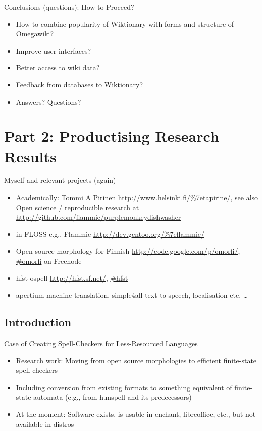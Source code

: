 \documentclass[t,12pt]{beamer}
\begin{document}
\begin{frame}{Conclusions (questions): How to Proceed?}
    \begin{itemize}
        \item How to combine popularity of Wiktionary with forms and structure
            of Omegawiki?
        \item Improve user interfaces?
        \item Better access to wiki data?
        \item Feedback from databases to Wiktionary?
        \item Answers? Questions? 
    \end{itemize}
\end{frame}

\HyTitle

\section{Part 2: Productising Research Results}

\begin{frame}{Myself and relevant projects (again)}
    \begin{itemize}
        \item Academically: Tommi A Pirinen \url{http://www.helsinki.fi/\%7etapirine/}, see also Open science / reproducible research at \url{http://github.com/flammie/purplemonkeydishwasher}
        \item in FLOSS e.g., Flammie \url{http://dev.gentoo.org/\%7eflammie/}
        \item Open source morphology for Finnish \url{http://code.google.com/p/omorfi/}, \url{\#omorfi} on Freenode
        \item hfst-ospell \url{http://hfst.sf.net/}, \url{\#hfst}
        \item apertium machine translation, simple4all text-to-speech, 
            localisation etc. \ldots
    \end{itemize}
\end{frame}


\subsection{Introduction}

\begin{frame}{Case of Creating Spell-Checkers for Less-Resourced Languages}
    \begin{itemize}
        \item Research work: Moving from open source morphologies to efficient
            finite-state spell-checkers
        \item Including conversion from existing formats to something equivalent
            of finite-state automata (e.g., from hunspell and its predecessors)
        \item At the moment: Software exists, is usable in enchant, libreoffice,
            etc., but not available in distros
    \end{itemize}
\end{frame}
\end{document}
